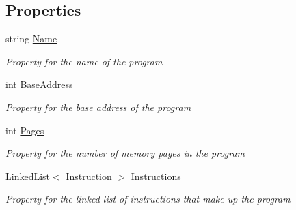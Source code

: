 \subsection*{Properties}
\begin{DoxyCompactItemize}
\item 
string \hyperlink{class_c_p_u___o_s___simulator_1_1_simulator_program_a1f86d599b2126d389a1ed956f98234b3}{Name}
\begin{DoxyCompactList}\small\item\em Property for the name of the program \end{DoxyCompactList}\item 
int \hyperlink{class_c_p_u___o_s___simulator_1_1_simulator_program_a568c9415fc2be2ba79154438aca2f932}{Base\+Address}
\begin{DoxyCompactList}\small\item\em Property for the base address of the program \end{DoxyCompactList}\item 
int \hyperlink{class_c_p_u___o_s___simulator_1_1_simulator_program_acb651f746bd98040b6b7a06637b83fa3}{Pages}
\begin{DoxyCompactList}\small\item\em Property for the number of memory pages in the program \end{DoxyCompactList}\item 
Linked\+List$<$ \hyperlink{class_c_p_u___o_s___simulator_1_1_c_p_u_1_1_instruction}{Instruction} $>$ \hyperlink{class_c_p_u___o_s___simulator_1_1_simulator_program_a4e097e30428645df3a4f7bde49118a02}{Instructions}
\begin{DoxyCompactList}\small\item\em Property for the linked list of instructions that make up the program \end{DoxyCompactList}\end{DoxyCompactItemize}

